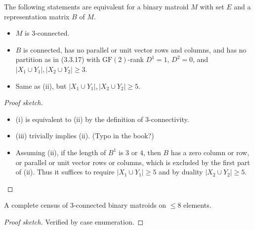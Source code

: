 \begin{lemma}[3.3.20]
  \label{lem:3.3.20}
  The following statements are equivalent for a binary matroid $M$ with set $E$ and a representation matrix $B$ of $M$.
  \begin{itemize}
    \item $M$ is $3$-connected.
    \item $B$ is connected, has no parallel or unit vector rows and columns, and has no partition as in (3.3.17) with $\mathrm{GF}(2)$-rank $D^{1} = 1$, $D^{2} = 0$, and $|X_{1} \cup Y_{1}|, |X_{2} \cup Y_{2}| \geq 3$.
    \item Same as (ii), but $|X_{1} \cup Y_{1}|, |X_{2} \cup Y_{2}| \geq 5$.
  \end{itemize}
\end{lemma}

\begin{proof}[Proof sketch]
  \begin{itemize}
    \item (i) is equivalent to (ii) by the definition of $3$-connectivity.
    \item (iii) trivially implies (ii). (Typo in the book?)
    \item Assuming (ii), if the length of $B^{1}$ is $3$ or $4$, then $B$ has a zero column or row, or parallel or unit vector rows or columns, which is excluded by the first part of (ii). Thus it suffices to require $|X_{1} \cup Y_{1}| \geq 5$ and by duality $|X_{2} \cup Y_{2}| \geq 5$.
  \end{itemize}
\end{proof}

\begin{theorem}
  \label{census sec 3.3}
  A complete census of $3$-connected binary matroids on $\leq 8$ elements.
\end{theorem}

\begin{proof}[Proof sketch]
  Verified by case enumeration.
\end{proof}
